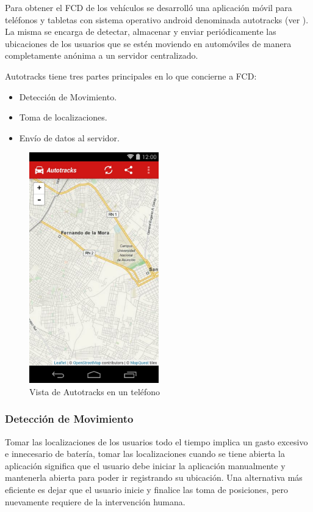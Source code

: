 Para obtener el FCD de los vehículos se desarrolló una aplicación móvil para teléfonos y tabletas con sistema operativo android denominada autotracks (ver ). La misma se encarga de detectar, almacenar y enviar periódicamente las ubicaciones de los usuarios que se estén moviendo en automóviles de manera completamente anónima a un servidor centralizado.

Autotracks tiene tres partes principales en lo que concierne a FCD: 
\begin{itemize}
	\item Detección de Movimiento.
	\item Toma de localizaciones.
	\item Envío de datos al servidor.
\end{itemize}

\begin{figure}[h]
	\centering
	\includegraphics[width=0.5\textwidth]{capitulos/6/figuras/figura2.jpg}
	\caption{\label{fig:autotracks} Vista de Autotracks en un teléfono}	
\end{figure}

\subsubsection{Detección de Movimiento}

Tomar las localizaciones de los usuarios todo el tiempo implica un gasto excesivo e innecesario de batería, tomar las localizaciones cuando se tiene abierta la aplicación significa que el usuario debe iniciar la aplicación manualmente y mantenerla abierta para poder ir registrando su ubicación. Una alternativa más eficiente es dejar que el usuario inicie y finalice las toma de posiciones, pero nuevamente requiere de la intervención humana.

